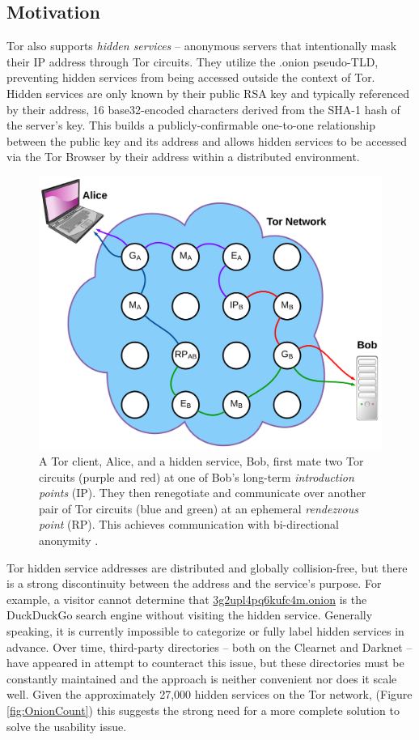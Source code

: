\documentclass[conference]{IEEEtran}
\begin{document}
\subsection{Motivation}

Tor also supports \emph{hidden services} -- anonymous servers that intentionally mask their IP address through Tor circuits. They utilize the .onion pseudo-TLD, preventing hidden services from being accessed outside the context of Tor. Hidden services are only known by their public RSA key and typically referenced by their address, 16 base32-encoded characters derived from the SHA-1 hash of the server's key. This builds a publicly-confirmable one-to-one relationship between the public key and its address and allows hidden services to be accessed via the Tor Browser by their address within a distributed environment.

\begin{figure}[htbp]
	\centering
	\includegraphics[width=0.9\linewidth]{../assets/images/LucidCharts/Hidden_Services.pdf}
	\caption{A Tor client, Alice, and a hidden service, Bob, first mate two Tor circuits (purple and red) at one of Bob's long-term \emph{introduction points} (IP). They then renegotiate and communicate over another pair of Tor circuits (blue and green) at an ephemeral \emph{rendezvous point} (RP). This achieves communication with bi-directional anonymity \cite{overlier2006locating}.}
\end{figure}

Tor hidden service addresses are distributed and globally collision-free, but there is a strong discontinuity between the address and the service's purpose. For example, a visitor cannot determine that \url{3g2upl4pq6kufc4m.onion} is the DuckDuckGo search engine without visiting the hidden service. Generally speaking, it is currently impossible to categorize or fully label hidden services in advance. Over time, third-party directories -- both on the Clearnet and Darknet -- have appeared in attempt to counteract this issue, but these directories must be constantly maintained and the approach is neither convenient nor does it scale well. Given the approximately 27,000 hidden services on the Tor network,  (Figure \ref{fig:OnionCount}) this suggests the strong need for a more complete solution to solve the usability issue.
\end{document}
